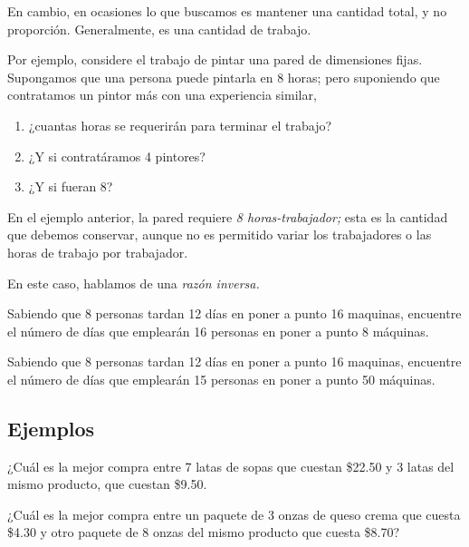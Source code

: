 	En cambio, en ocasiones lo que buscamos es mantener una cantidad total, y no proporci\'on. Generalmente, es una cantidad de trabajo.



	Por ejemplo, considere el trabajo de pintar una pared de dimensiones fijas.
	Supongamos que una persona puede pintarla en 8 horas; pero suponiendo que contratamos un pintor más con una experiencia similar, 
	\begin{enumerate}
		\item ¿cuantas horas se requerirán para terminar el trabajo? 
		\item ¿Y si contratáramos 4 pintores? 
		\item ¿Y si fueran 8?
	\end{enumerate}
	



	En el ejemplo anterior, la pared requiere \emph{8 horas-trabajador;} esta es la cantidad que debemos conservar, aunque no es permitido variar los trabajadores o las horas de trabajo por trabajador.



	En este caso, hablamos de una \emph{raz\'on inversa.} 



	\begin{problema}
		Sabiendo que 8 personas tardan 12 d\'ias en poner a punto 16 maquinas, encuentre el número de d\'ias que emplearán 16 personas en poner a punto 8 máquinas. 
	\end{problema}
	



	\begin{problema}
		Sabiendo que 8 personas tardan 12 d\'ias en poner a punto 16 maquinas, encuentre el número de d\'ias que emplearán 15 personas en poner a punto 50 máquinas. 
	\end{problema}
	


\subsection{Ejemplos}


	\begin{problema}
		¿Cuál es la mejor compra entre 7 latas de sopas que cuestan \$22.50 y 3 latas del mismo producto, que cuestan \$9.50.
	\end{problema}
	



	\begin{problema}
		¿Cuál es la mejor compra entre un paquete de 3 onzas de queso crema que cuesta \$4.30 y otro paquete de 8 onzas del mismo producto que cuesta \$8.70?
	\end{problema}
	



